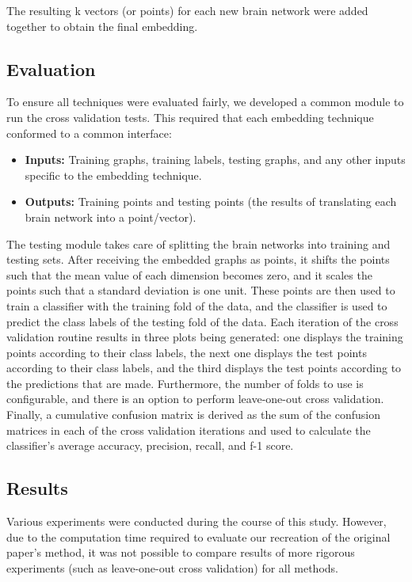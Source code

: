 \documentclass[sigconf]{acmart}
\begin{document}
The resulting k vectors (or points) for each new brain network were added together to obtain the final embedding.


\subsection{Evaluation} \label{evaluation}

To ensure all techniques were evaluated fairly, we developed a common module to run the cross validation tests.
This required that each embedding technique conformed to a common interface:

\begin{itemize}
    \item \textbf{Inputs:} Training graphs, training labels, testing graphs, and any other inputs specific to the embedding technique.
    \item \textbf{Outputs:} Training points and testing points (the results of translating each brain network into a point/vector).
\end{itemize}

The testing module takes care of splitting the brain networks into training and testing sets.
After receiving the embedded graphs as points, it shifts the points such that the mean value of each dimension becomes zero, and it scales the points such that a standard deviation is one unit.
These points are then used to train a classifier with the training fold of the data, and the classifier is used to predict the class labels of the testing fold of the data.
Each iteration of the cross validation routine results in three plots being generated: one displays the training points according to their class labels, the next one displays the test points according to their class labels, and the third displays the test points according to the predictions that are made.
Furthermore, the number of folds to use is configurable, and there is an option to perform leave-one-out cross validation.
Finally, a cumulative confusion matrix is derived as the sum of the confusion matrices in each of the cross validation iterations and used to calculate the classifier's average accuracy, precision, recall, and f-1 score.

\subsection{Results} \label{results}

Various experiments were conducted during the course of this study.
However, due to the computation time required to evaluate our recreation of the original paper's method, it was not possible to compare results of more rigorous experiments (such as leave-one-out cross validation) for all methods.
\end{document}

